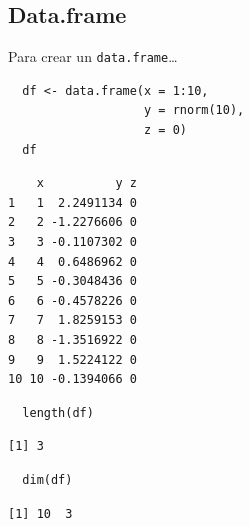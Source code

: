 \documentclass[xcolor={usenames,svgnames,dvipsnames}]{beamer}
\begin{document}
\subsection{Data.frame}
\label{sec-3-2}
\begin{frame}[fragile,label=sec-3-2-1]{Para crear un \texttt{data.frame}\ldots{}}
 \lstset{language=R,label= ,caption= ,numbers=none}
\begin{lstlisting}
  df <- data.frame(x = 1:10,
                   y = rnorm(10),
                   z = 0)
  df
\end{lstlisting}

\begin{verbatim}
    x          y z
1   1  2.2491134 0
2   2 -1.2276606 0
3   3 -0.1107302 0
4   4  0.6486962 0
5   5 -0.3048436 0
6   6 -0.4578226 0
7   7  1.8259153 0
8   8 -1.3516922 0
9   9  1.5224122 0
10 10 -0.1394066 0
\end{verbatim}

\lstset{language=R,label= ,caption= ,numbers=none}
\begin{lstlisting}
  length(df)
\end{lstlisting}

\begin{verbatim}
[1] 3
\end{verbatim}

\lstset{language=R,label= ,caption= ,numbers=none}
\begin{lstlisting}
  dim(df)
\end{lstlisting}

\begin{verbatim}
[1] 10  3
\end{verbatim}
\end{frame}
\end{document}
